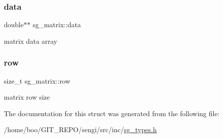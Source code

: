 \subsubsection{\texorpdfstring{data}{data}}
{\footnotesize\ttfamily double$\ast$$\ast$ sg\+\_\+matrix\+::data}

matrix data array \hypertarget{structsg__matrix_a815d3621cbdce7489fbf453286515aa7}{}\label{structsg__matrix_a815d3621cbdce7489fbf453286515aa7} 
\subsubsection{\texorpdfstring{row}{row}}
{\footnotesize\ttfamily size\+\_\+t sg\+\_\+matrix\+::row}

matrix row size 

The documentation for this struct was generated from the following file\+:\begin{DoxyCompactItemize}
\item 
/home/boo/\+G\+I\+T\+\_\+\+R\+E\+P\+O/sengi/src/inc/\hyperlink{sg__types_8h}{sg\+\_\+types.\+h}\end{DoxyCompactItemize}
